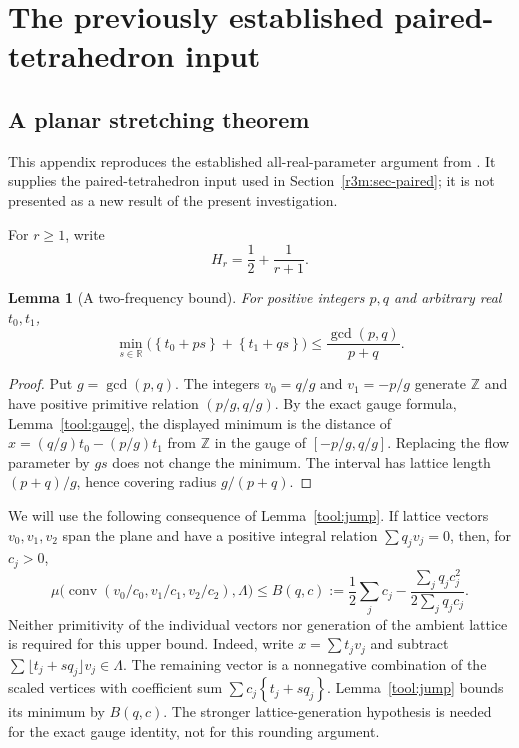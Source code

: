 \documentclass[11pt,a4paper]{article}
\newtheorem{lemma}[theorem]{Lemma}
\theoremstyle{remark}\newtheorem{remark}[theorem]{Remark}
\DeclareMathOperator{\conv}{conv}
\newcommand{\R}{\mathbb R}\newcommand{\Z}{\mathbb Z}\newcommand{\Q}{\mathbb Q}
\newcommand{\fr}[1]{\left\{#1\right\}}\newcommand{\one}{\mathbf1}
\begin{document}
\appendix
\section{The previously established paired-tetrahedron input}
\label{app:paired}

\subsection{A planar stretching theorem}
\label{rr:sec:stretch}

This appendix reproduces the established all-real-parameter argument
from \cite{TransferTwo}. It supplies the paired-tetrahedron input used
in Section~\ref{r3m:sec-paired}; it is not presented as a new result
of the present investigation.

For $r\ge1$, write
\begin{equation}\label{rr:eq:H}
 H_r=\frac12+\frac1{r+1}.
\end{equation}

\begin{lemma}[A two-frequency bound]\label{rr:lem:twofrequency}
For positive integers $p,q$ and arbitrary real $t_0,t_1$,
\[
 \min_{s\in\R}\bigl(\fr{t_0+ps}+\fr{t_1+qs}\bigr)
 \le\frac{\gcd(p,q)}{p+q}.
\]
\end{lemma}
\begin{proof}
Put $g=\gcd(p,q)$.  The integers $v_0=q/g$ and $v_1=-p/g$
generate $\Z$ and have positive primitive relation $(p/g,q/g)$.
By the exact gauge formula, Lemma~\ref{tool:gauge}, the displayed
minimum is the distance of
$x=(q/g)t_0-(p/g)t_1$ from $\Z$ in the gauge of
$[-p/g,q/g]$.  Replacing the flow parameter by $gs$ does not change
the minimum.  The interval has lattice length $(p+q)/g$, hence
covering radius $g/(p+q)$.
\end{proof}

We will use the following consequence of Lemma~\ref{tool:jump}.
If lattice vectors $v_0,v_1,v_2$ span the plane and have a positive
integral relation $\sum q_jv_j=0$, then, for $c_j>0$,
\begin{equation}\label{rr:eq:trianglebound}
 \mu\bigl(\conv(v_0/c_0,v_1/c_1,v_2/c_2),\Lambda\bigr)
 \le B(q,c):=
 \frac12\sum_jc_j-
 \frac{\sum_jq_jc_j^2}{2\sum_jq_jc_j}.
\end{equation}
Neither primitivity of the individual vectors nor generation of the
ambient lattice is required for this upper bound.  Indeed, write
$x=\sum t_jv_j$ and subtract
$\sum\lfloor t_j+sq_j\rfloor v_j\in\Lambda$.  The remaining vector
is a nonnegative combination of the scaled vertices with coefficient
sum $\sum c_j\fr{t_j+sq_j}$.  Lemma~\ref{tool:jump} bounds its
minimum by $B(q,c)$.  The stronger lattice-generation hypothesis is
needed for the exact gauge identity, not for this rounding argument.
\end{document}
